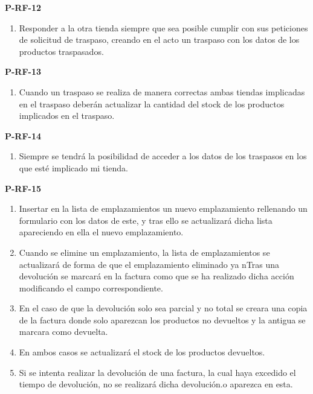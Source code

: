 \textbf{P-RF-12}
\begin{enumerate}
	\item Responder a la otra tienda siempre que sea posible cumplir con sus peticiones de solicitud de traspaso, creando en el acto un traspaso con los datos de los productos traspasados.
\end{enumerate}

\textbf{P-RF-13}
\begin{enumerate}
	\item Cuando un traspaso se realiza de manera correctas ambas tiendas implicadas en el traspaso deberán actualizar la cantidad del stock de los productos implicados en el traspaso.
\end{enumerate}

\textbf{P-RF-14}
\begin{enumerate}
	\item Siempre se tendrá la posibilidad de acceder a los datos de los traspasos en los que esté implicado mi tienda.
\end{enumerate}

\textbf{P-RF-15}
\begin{enumerate}
	\item Insertar en la lista de emplazamientos un nuevo emplazamiento rellenando un formulario con los datos de este, y tras ello se actualizará dicha lista apareciendo en ella el nuevo emplazamiento.
	\item Cuando se elimine un emplazamiento, la lista de emplazamientos se actualizará de forma de que el emplazamiento eliminado ya nTras una devolución se marcará en la factura como que se ha realizado dicha acción modificando el campo correspondiente.
	\item En el caso de que la devolución solo sea parcial y no total se creara una copia de la factura donde solo aparezcan los productos no devueltos y la antigua se marcara como devuelta.
	\item En ambos casos se actualizará el stock de los productos devueltos.
	\item Si se intenta realizar la devolución de una factura, la cual haya excedido el tiempo de devolución, no se realizará dicha devolución.o aparezca en esta.
\end{enumerate}

